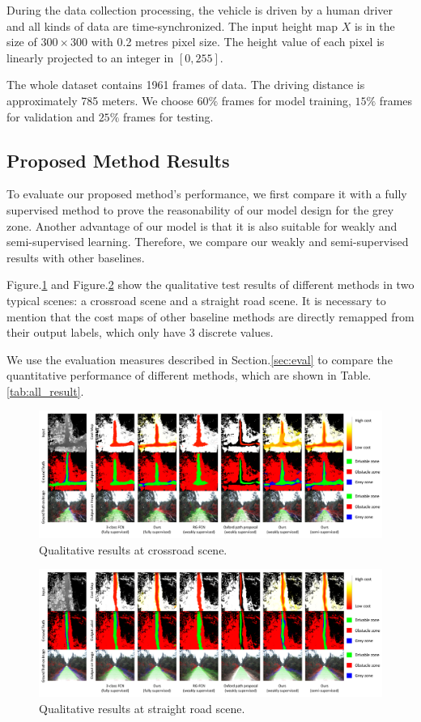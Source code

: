\documentclass[letterpaper, 10 pt, conference]{ieeeconf}  %
\begin{document}
During the data collection processing, the vehicle is driven by a human driver and all kinds of data are time-synchronized. The input height map $X$ is in the size of $300\times 300$ with 0.2 metres pixel size. The height value of each pixel is linearly projected to an integer in $[0,255]$.

The whole dataset contains 1961 frames of data. The driving distance is approximately 785 meters. We choose $60\%$ frames for model training, $15\%$ frames for validation and $25\%$ frames for testing.

\subsection{Proposed Method Results}
To evaluate our proposed method's performance, we first compare it with a fully supervised method to prove the reasonability of our model design for the grey zone. Another advantage of our model is that it is also suitable for weakly and semi-supervised learning. Therefore, we compare our weakly and semi-supervised results with other baselines.

Figure.\ref{fig:cross_road} and Figure.\ref{fig:straight_road} show the qualitative test results of different methods in two typical scenes: a crossroad scene and a straight road scene. It is necessary to mention that the cost maps of other baseline methods are directly remapped from their output labels, which only have 3 discrete values.

We use the evaluation measures described in Section.\ref{sec:eval} to compare the quantitative performance of different methods, which are shown in Table.\ref{tab:all_result}. 

\begin{figure}[ht]
	\centering
	\includegraphics[scale=0.15]{crossRoad.pdf}
	\caption{Qualitative results at crossroad scene.}
	\label{fig:cross_road}
	\vspace{-2mm}
\end{figure}
\begin{figure}[ht]
	\centering
	\includegraphics[scale=0.15]{straightRoad.pdf}
	\caption{Qualitative results at straight road scene.}
	\label{fig:straight_road}
\end{figure}
\end{document}
